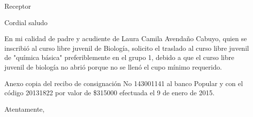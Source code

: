 \documentclass[letterpaper,spanish,11pt]{letter}
\begin{document}
\begin{letter}{Receptor}
	
\opening{Cordial saludo}
En mi calidad de padre y acudiente de Laura Camila Avendaño Cabuyo, quien se inscribió al curso libre juvenil de Biología, solicito el traslado al curso libre juvenil de "química básica" preferiblemente en el grupo 1, debido a que el curso libre juvenil de biología no abrió porque no se llenó el cupo mínimo requerido.

Anexo copia del recibo de consignación No 143001141 al banco Popular y con el código 20131822 por valor de \$315000 efectuada el 9 de enero de 2015.
\closing{Atentamente,}


\end{letter}
\end{document}
